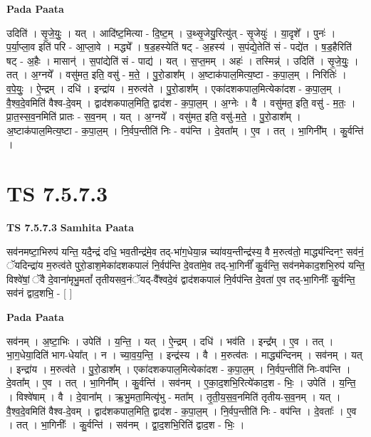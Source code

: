 \documentclass[17pt]{extarticle}
\begin{document}
\textbf{Pada Paata} \newline

उदिति॑ । सृ॒जे॒युः॒ । यत् । आदि॑ष्ट॒मित्या - दि॒ष्ट॒म् । उ॒थ्सृ॒जेयु॒रित्यु॑त् - सृ॒जेयुः॑ । या॒दृशे᳚ । पुनः॑ । प॒र्या॒प्ला॒व इति॑ परि - आ॒प्ला॒वे । मद्ध्ये᳚ । ष॒ड॒हस्येति॑ षट् - अ॒हस्य॑ । स॒पंद्ये॒तेति॑ सं - पद्ये॑त । ष॒ड॒हैरिति॑ षट् - अ॒हैः । मासान्॑ । स॒पांद्येति॑ सं - पाद्य॑ । यत् । स॒प्त॒मम् । अहः॑ । तस्मिन्न्॑ । उदिति॑ । सृ॒जे॒युः॒ । तत् । अ॒ग्नये᳚ । वसु॑मत॒ इति॒ वसु॑ - म॒ते॒ । पु॒रो॒डाश᳚म् । अ॒ष्टाक॑पाल॒मित्य॒ष्टा - क॒पा॒ल॒म् । निरितिः॑ । व॒पे॒युः॒ । ऐ॒न्द्रम् । दधि॑ । इन्द्रा॑य । म॒रुत्व॑ते । पु॒रो॒डाश᳚म् । एका॑दशकपाल॒मित्येका॑दश - क॒पा॒ल॒म् । वै॒श्व॒दे॒वमिति॑ वैश्व-दे॒वम् । द्वाद॑शकपाल॒मिति॒ द्वाद॑श - क॒पा॒ल॒म् । अ॒ग्नेः । वै । वसु॑मत॒ इति॒ वसु॑ - म॒तः॒ । प्रा॒त॒स्स॒व॒नमिति॑ प्रातः - स॒व॒नम् । यत् । अ॒ग्नये᳚ । वसु॑मत॒ इति॒ वसु॑-म॒ते॒ । पु॒रो॒डाश᳚म् । अ॒ष्टाक॑पाल॒मित्य॒ष्टा - क॒पा॒ल॒म् । नि॒र्वप॒न्तीति॑ निः - वप॑न्ति । दे॒वता᳚म् । ए॒व । तत् । भा॒गिनी᳚म् । कु॒र्वन्ति॑ ।  \newline





\section{ TS 7.5.7.3 }

\textbf{TS 7.5.7.3 } \newline
\textbf{Samhita Paata} \newline

सव॑नमष्टा॒भिरुप॑ यन्ति॒ यदै॒न्द्रं दधि॒ भव॒तीन्द्र॑मे॒व तद्-भा॑ग॒धेया॒न्न च्या॑वय॒न्तीन्द्र॑स्य॒ वै म॒रुत्व॑तो॒ माद्ध्य॑न्दिनꣳ॒॒ सव॑नं॒ ॅयदिन्द्रा॑य म॒रुत्व॑ते पुरो॒डाश॒मेका॑दशकपालं नि॒र्वप॑न्ति दे॒वता॑मे॒व तद्-भा॒गिनीं᳚ कु॒र्वन्ति॒ सव॑नमेकाद॒शभि॒रुप॑ यन्ति॒ विश्वे॑षां॒ ॅवै दे॒वाना॑मृभु॒मतां᳚ तृतीयसव॒नंॅयद्-वै᳚श्वदे॒वं द्वाद॑शकपालं नि॒र्वप॑न्ति दे॒वता॑ ए॒व तद्-भा॒गिनीः᳚ कु॒र्वन्ति॒ सव॑नं द्वाद॒शभि॒ - [  ] \newline

\textbf{Pada Paata} \newline

सव॑नम् । अ॒ष्टा॒भिः । उपेति॑ । य॒न्ति॒ । यत् । ऐ॒न्द्रम् । दधि॑ । भव॑ति । इन्द्र᳚म् । ए॒व । तत् । भा॒ग॒धेया॒दिति॑ भाग-धेया᳚त् । न । च्या॒व॒य॒न्ति॒ । इन्द्र॑स्य । वै । म॒रुत्व॑तः । माद्ध्य॑न्दिनम् । सव॑नम् । यत् । इन्द्रा॑य । म॒रुत्व॑ते । पु॒रो॒डाश᳚म् । एका॑दशकपाल॒मित्येका॑दश - क॒पा॒ल॒म् । नि॒र्वप॒न्तीति॑ निः-वप॑न्ति । दे॒वता᳚म् । ए॒व । तत् । भा॒गिनी᳚म् । कु॒र्वन्ति॑ । सव॑नम् । ए॒का॒द॒शभि॒रित्ये॑काद॒श - भिः॒ । उपेति॑ । य॒न्ति॒ । विश्वे॑षाम् । वै । दे॒वाना᳚म् । ऋ॒भु॒मता॒मित्यृ॑भु - मता᳚म् । तृ॒ती॒य॒स॒व॒नमिति॑ तृतीय-स॒व॒नम् । यत् । वै॒श्व॒दे॒वमिति॑ वैश्व-दे॒वम् । द्वाद॑शकपाल॒मिति॒ द्वाद॑श - क॒पा॒ल॒म् । नि॒र्वप॒न्तीति॑ निः - वप॑न्ति । दे॒वताः᳚ । ए॒व । तत् । भा॒गिनीः᳚ । कु॒र्वन्ति॑ । सव॑नम् । द्वा॒द॒शभि॒रिति॑ द्वाद॒श - भिः॒ ।  \newline
\end{document}
